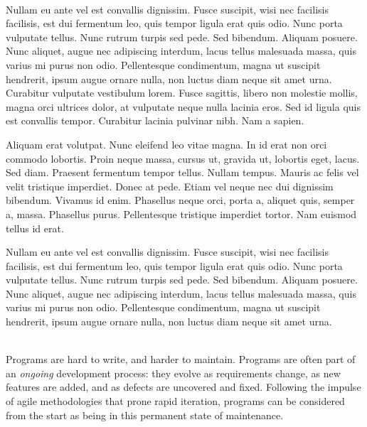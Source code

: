 \begin{titlepage}
\vspace{2cm}
\begin{addmargin}[-1cm]{-4cm}
\begin{flushright}
\sffamily\LARGE\titleen
\end{flushright}
\vfill
\noindent
\begin{minipage}[t]{9cm}

\\
\begin{raggedright}
Nullam eu ante vel est convallis dignissim.  Fusce suscipit, wisi nec facilisis
facilisis, est dui fermentum leo, quis tempor ligula erat quis odio.  Nunc porta
vulputate tellus.  Nunc rutrum turpis sed pede.  Sed bibendum.  Aliquam posuere.
Nunc aliquet, augue nec adipiscing interdum, lacus tellus malesuada massa, quis
varius mi purus non odio.  Pellentesque condimentum, magna ut suscipit
hendrerit, ipsum augue ornare nulla, non luctus diam neque sit amet urna.
Curabitur vulputate vestibulum lorem.  Fusce sagittis, libero non molestie
mollis, magna orci ultrices dolor, at vulputate neque nulla lacinia eros.  Sed
id ligula quis est convallis tempor.  Curabitur lacinia pulvinar nibh.  Nam a
sapien.

Aliquam erat volutpat.  Nunc eleifend leo vitae magna.  In id erat non orci
commodo lobortis.  Proin neque massa, cursus ut, gravida ut, lobortis eget,
lacus.  Sed diam.  Praesent fermentum tempor tellus.  Nullam tempus.  Mauris ac
felis vel velit tristique imperdiet.  Donec at pede.  Etiam vel neque nec dui
dignissim bibendum.  Vivamus id enim.  Phasellus neque orci, porta a, aliquet
quis, semper a, massa.  Phasellus purus.  Pellentesque tristique imperdiet
tortor.  Nam euismod tellus id erat.

Nullam eu ante vel est convallis dignissim.  Fusce suscipit, wisi nec facilisis
facilisis, est dui fermentum leo, quis tempor ligula erat quis odio.  Nunc porta
vulputate tellus.  Nunc rutrum turpis sed pede.  Sed bibendum.  Aliquam posuere.
Nunc aliquet, augue nec adipiscing interdum, lacus tellus malesuada massa, quis
varius mi purus non odio.  Pellentesque condimentum, magna ut suscipit
hendrerit, ipsum augue ornare nulla, non luctus diam neque sit amet urna.
\end{raggedright}
\end{minipage}%
\hspace{1cm}%
\begin{minipage}[t]{9cm}
\\
Programs are hard to write, and harder to maintain.  Programs are often part of
an \emph{ongoing} development process: they evolve as requirements change, as
new features are added, and as defects are uncovered and fixed.  Following the
impulse of agile methodologies that prone rapid iteration, programs can be
considered from the start as being in this permanent state of maintenance.


\end{minipage}
\end{addmargin}
\end{titlepage}
